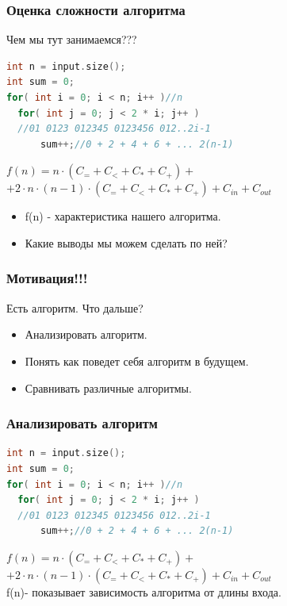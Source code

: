 \documentclass[russian, 12pt]{beamer}
\begin{document}
\lstset{style=mystyle}
\begin{frame}[fragile]
\frametitle{Оценка сложности алгоритма}
Чем мы тут занимаемся???
\begin{lstlisting}[language=C++]
int n = input.size();
int sum = 0;
for( int i = 0; i < n; i++ )//n
  for( int j = 0; j < 2 * i; j++ )
  //01 0123 012345 0123456 012..2i-1
      sum++;//0 + 2 + 4 + 6 + ... 2(n-1)  
\end{lstlisting}
  $f(n) = n \cdot (C_= + C_< + C_* + C_+) +$\\
  $ + 2\cdot n \cdot (n-1) \cdot (C_= + C_< + C_* + C_+) + C_{in} + C_{out}$\\[0.3cm]
  \begin{itemize}
    \item f(n) - характеристика нашего алгоритма.
    \item Какие выводы мы можем сделать по ней?
  \end{itemize}
  
\end{frame}
\begin{frame}
\frametitle{Мотивация!!!}
Есть алгоритм. Что дальше?\\[0.3cm]

\begin{itemize}

  \item Анализировать алгоритм.\\[0.5cm]
  
  \item Понять как поведет себя алгоритм в будущем.\\[0.5cm]
  
  \item Сравнивать различные алгоритмы.\\[0.5cm]
  
\end{itemize}

\end{frame}
\begin{frame}[fragile]
\frametitle{Анализировать алгоритм}
\begin{lstlisting}[language=C++]
int n = input.size();
int sum = 0;
for( int i = 0; i < n; i++ )//n
  for( int j = 0; j < 2 * i; j++ )
  //01 0123 012345 0123456 012..2i-1
      sum++;//0 + 2 + 4 + 6 + ... 2(n-1)  
\end{lstlisting}
$f(n) = n \cdot (C_= + C_< + C_* + C_+) +$\\
$ + 2\cdot n \cdot (n-1) \cdot (C_= + C_< + C_* + C_+) + C_{in} + C_{out}$\\[0.2cm]
\pause
f(n)- показывает зависимость алгоритма от длины входа.
\end{frame}
\end{document}
